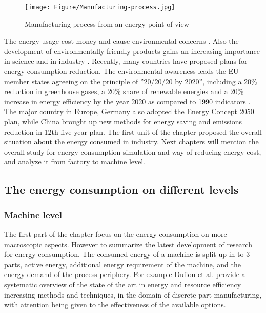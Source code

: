 \begin{figure}[h!]
	\centering
	\texttt{[image: Figure/Manufacturing-process.jpg]}
	\caption{Manufacturing process from an energy point of view \cite{Apostolos2013}}
	\label{fig:Manufacturingprocess}
\end{figure}

The energy usage cost money and cause environmental concerns \cite{Dietmair2009}. Also the development of environmentally friendly products gains an increasing importance in science and in industry \cite{Abele2005}. Recently, many countries have proposed plans for energy consumption reduction. The environmental awareness leads the EU member states agreeing on the principle of ''20/20/20 by 2020'', including a 20\% reduction in greenhouse gases, a 20\% share of renewable energies and a 20\% increase in energy efficiency by the year 2020 as compared to 1990 indicators \cite{Apostolos2013}. The major country in Europe, Germany also adopted the Energy Concept 2050 plan, while China brought up new methods for energy saving and emissions reduction in 12th five year plan. The first unit of the chapter proposed the overall situation about the energy consumed in industry. Next chapters will mention the overall study for energy consumption simulation and way of reducing energy cost, and analyze it from factory to machine level.


\subsection{The energy consumption on different levels}
\subsubsection{Machine level}

The first part of the chapter focus on the energy consumption on more macroscopic aspects. However to summarize the latest development of research for energy consumption. The consumed energy of a machine is split up in to 3 parts, active energy, additional energy requirement of the machine, and the energy demand of the process-periphery.  For example Duflou et al.\cite{Duflou2012} provide a systematic overview of the state of the art in energy and resource efficiency increasing methods and techniques, in the domain of discrete part manufacturing, with attention being given to the effectiveness of the available options.

